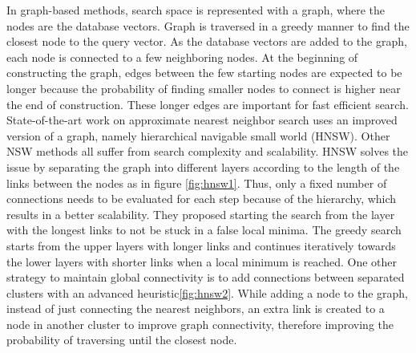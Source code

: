 In graph-based methods, search space is represented with a graph, where the nodes are the database vectors. 
Graph is traversed in a greedy manner to find the closest node to the query vector.
As the database vectors are added to the graph, each node is connected to a few neighboring nodes.
At the beginning of constructing the graph, edges between the few starting nodes are expected to be longer because the probability of finding smaller nodes to connect is higher near the end of construction.
These longer edges are important for fast efficient search.
State-of-the-art work on approximate nearest neighbor search uses an improved version of a graph, namely hierarchical navigable small world (HNSW)\cite{malkov2018efficient}. 
Other NSW methods all suffer from search complexity and scalability. 
HNSW solves the issue by separating the graph into different layers according to the length of the links between the nodes as in figure \ref{fig:hnsw1}. 
Thus, only a fixed number of connections needs to be evaluated for each step because of the hierarchy, which results in a better scalability.
They proposed starting the search from the layer with the longest links to not be stuck in a false local minima. 
The greedy search starts from the upper layers with longer links and continues iteratively towards the lower layers with shorter links when a local minimum is reached.
One other strategy to maintain global connectivity is to add connections between separated clusters with an advanced heuristic\ref{fig:hnsw2}. 
While adding a node to the graph, instead of just connecting the nearest neighbors, an extra link is created to a node in another cluster to improve graph connectivity, therefore improving the probability of traversing until the closest node.

